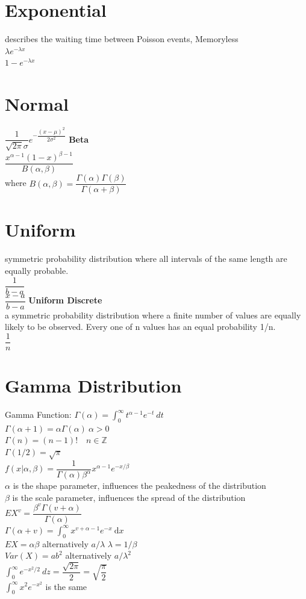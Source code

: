 \documentclass[openany]{book}
\newcommand{\dx}{\mathrm{d}x}
\begin{document}
\section{Exponential}
describes the waiting time between Poisson events, Memoryless\\
$\lambda e^{-\lambda x}$\\
$1-e^{-\lambda x}$\medbreak
\section{Normal}
$\dfrac{1}{\sqrt{2\pi}\sigma}e^{-\dfrac{(x-\mu)^2}{2\sigma^2}}$
\textbf{Beta}\\
$\dfrac{x^{\alpha-1}(1-x)^{\beta-1}}{B(\alpha,\beta)}$\\
where $B(\alpha,\beta)=\dfrac{\Gamma(\alpha)\Gamma(\beta)}{\Gamma(\alpha+\beta)}$ \medbreak
\section{Uniform}
symmetric probability distribution where all intervals of the same length are equally probable.\\
$\dfrac{1}{b-a}$\\
$\dfrac{x-a}{b-a}$\medbreak
\textbf{Uniform Discrete}\\
a symmetric probability distribution where a finite number of values are equally likely to be observed. Every one of n values has an equal probability 1/n.\\
$\dfrac{1}{n}$\medbreak
\section{Gamma Distribution}
Gamma Function: $\Gamma(\alpha)=\int_{0}^{\infty}t^{\alpha-1}e^{-t} \ dt$\\
$\Gamma(\alpha+1)=\alpha \Gamma(\alpha) \ \alpha>0$\\
$\Gamma(n)=(n-1)! \quad n \in \mathbb{Z}$\\
$\Gamma(1/2)=\sqrt{\pi}$\\
$f(x|\alpha,\beta)=\dfrac{1}{\Gamma(\alpha) \beta^\alpha}x^{\alpha-1}e^{-x/\beta}$\\
$\alpha$ is the shape parameter, influences the peakedness of the distribution\\
$\beta$ is the scale parameter, influences the spread of the distribution\\
$EX^v=\dfrac{\beta^v \Gamma(v+\alpha)}{\Gamma(\alpha)}$\\
$\Gamma(\alpha+v)=\int_{0}^{\infty}x^{v+\alpha-1}e^{-x} \ \dx$\\
$EX=\alpha \beta$ alternatively $a/\lambda$ $\lambda=1/\beta$\\
$Var(X)=ab^2$ alternatively $a/\lambda^2$\\
$\int_{0}^{\infty}e^{-x^2/2} \ dz=\dfrac{\sqrt{2\pi}}{2}=\sqrt{\dfrac{\pi}{2}}$\\
$\int_{0}^{\infty}x^2e^{-x^2}$ is the same\\
\end{document}
